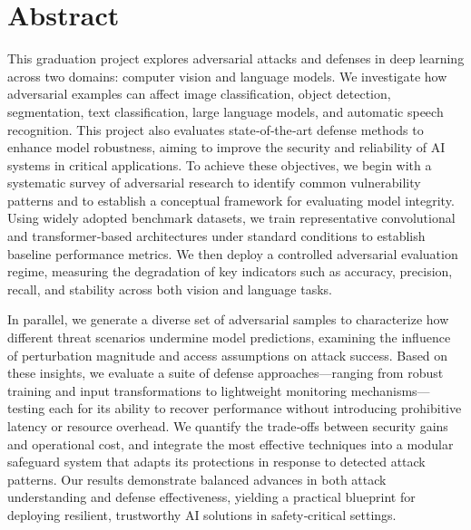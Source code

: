 \documentclass[a4paper,12pt]{report}
\begin{document}
\newpage

\chapter*{Abstract}

This graduation project explores adversarial attacks and defenses in deep learning across two domains: computer vision and language models. We investigate how adversarial examples can affect image classification, object detection, segmentation, text classification, large language models, and automatic speech recognition. This project also evaluates state‑of‑the‑art defense methods to enhance model robustness, aiming to improve the security and reliability of AI systems in critical applications. To achieve these objectives, we begin with a systematic survey of adversarial research to identify common vulnerability patterns and to establish a conceptual framework for evaluating model integrity. Using widely adopted benchmark datasets, we train representative convolutional and transformer‑based architectures under standard conditions to establish baseline performance metrics. We then deploy a controlled adversarial evaluation regime, measuring the degradation of key indicators such as accuracy, precision, recall, and stability across both vision and language tasks.

In parallel, we generate a diverse set of adversarial samples to characterize how different threat scenarios undermine model predictions, examining the influence of perturbation magnitude and access assumptions on attack success. Based on these insights, we evaluate a suite of defense approaches—ranging from robust training and input transformations to lightweight monitoring mechanisms—testing each for its ability to recover performance without introducing prohibitive latency or resource overhead. We quantify the trade‑offs between security gains and operational cost, and integrate the most effective techniques into a modular safeguard system that adapts its protections in response to detected attack patterns. Our results demonstrate balanced advances in both attack understanding and defense effectiveness, yielding a practical blueprint for deploying resilient, trustworthy AI solutions in safety‑critical settings.
\newpage

\tableofcontents
\newpage

\listoffigures
\newpage

\end{document}
